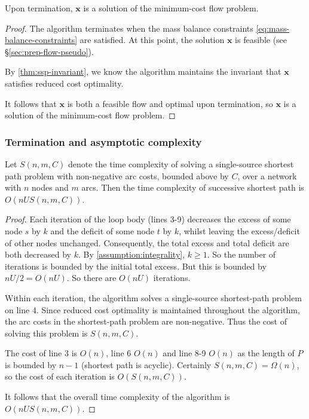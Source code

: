\begin{thm} \label{thm:ssp-correctness}
Upon termination, $\mathbf{x}$ is a solution of the minimum-cost flow problem.
\end{thm}
\begin{proof}
The algorithm terminates when the mass balance constraints \cref{eq:mass-balance-constraints} are satisfied. At this point, the solution $\mathbf{x}$ is feasible (see \S\ref{sec:prep-flow-pseudo}). 

By \cref{thm:ssp-invariant}, we know the algorithm maintains the invariant that $\mathbf{x}$ satisfies reduced cost optimality. 

It follows that $\mathbf{x}$ is both a feasible flow and optimal upon termination, so $\mathbf{x}$ is a solution of the minimum-cost flow problem.
\end{proof}

\subsubsection{Termination and asymptotic complexity}

\begin{thm} \label{thm:ssp-complexity}
Let $S(n,m,C)$ denote the time complexity of solving a single-source shortest path problem with non-negative arc costs, bounded above by $C$, over a network with $n$ nodes and $m$ arcs. Then the time complexity of successive shortest path is $O(nUS(n,m,C))$.
\end{thm}
\begin{proof}
Each iteration of the loop body (lines 3-9) decreases the excess of some node $s$ by $k$ and the deficit of some node $t$ by $k$, whilst leaving the excess/deficit of other nodes unchanged. Consequently, the total excess and total deficit are both decreased by $k$. By \cref{assumption:integrality}, $k \geq 1$. So the number of iterations is bounded by the initial total excess. But this is bounded by $nU/2 = O(nU)$. So there are $O(nU)$ iterations.

Within each iteration, the algorithm solves a single-source shortest-path problem on line 4. Since reduced cost optimality is maintained throughout the algorithm, the arc costs in the shortest-path problem are non-negative\footnotemark. Thus the cost of solving this problem is $S(n,m,C)$.

The cost of line 3 is $O(n)$, line 6 $O(n)$ and line 8-9 $O(n)$ as the length of $P$ is bounded by $n-1$ (shortest path is acyclic). Certainly $S(n,m,C) = \Omega(n)$, so the cost of each iteration is $O(S(n,m,C))$.

It follows that the overall time complexity of the algorithm is $O(nUS(n,m,C))$.
\end{proof}

